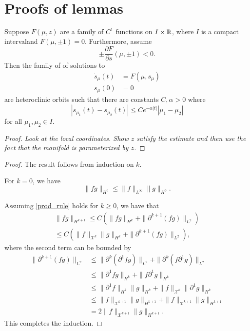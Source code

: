\chapter{Proofs of lemmas}\label{lemma-appendix}
\begin{lem}
	Suppose \(F(\mu, z)\) are a family of \(C^1\) functions on \(I \times \mathbb{R}\), where \(I\) is a compact intervaland \(F(\mu, \pm 1) = 0\). Furthermore, assume
	\begin{equation}
		\pm \frac{\partial F}{\partial s} (\mu , \pm 1) < 0.
	\end{equation}
	Then the family of of solutions to 
	\begin{equation}
		\begin{aligned}
			\dot s_\mu(t) &= F(\mu, s_\mu) \\
			s_\mu(0) &= 0
		\end{aligned}
	\end{equation}
	are heteroclinic orbits such that there are constants \(C, \alpha > 0\) where 
	\begin{equation}
		|s_{\mu_1} (t) - s_{\mu_2}(t) | \leq C e^{-\alpha |t|} |\mu_1- \mu_2|
	\end{equation}
	for all \(\mu_1,\mu_2 \in I\).
\end{lem}
\heteroclinicorbitsobolev*
\begin{proof}
	 \emph{Look at the local coordinates. Show \(z\) satisfy the estimate and then use the fact that the manifold is parameterized by \(z\). }
\end{proof}

\prodruleone*
\begin{proof}
	The result follows from induction on \(k\).
	
	For \(k = 0\), we have
	\begin{equation}
		\| f g \|_{H^0} \leq \| f \|_{L^\infty} \| g\|_{H^0}.
	\end{equation}
	
	Assuming \cref{prod_rule} holds for \(k\geq 0\), we have that 
	\begin{align*}
		\| f g \|_{H^{k+1}} \leq C \left( \| f g \|_{H^k} + \| \partial^{k+1}(fg) \|_{L^2}\right) \\
		\leq C \left( \| f\|_{\mathcal X^k} \| g \|_{H^k} + \| \partial^{k+1}(fg) \|_{L^2} \right),
	\end{align*}
	where the second term can be bounded by 
	\begin{align*}
		\| \partial^{k+1}(fg) \|_{L^2} &\leq \| \partial^k(\partial^1 f g ) \|_{L^2} + \| \partial^k(f \partial^1 g) \|_{L^2} \\
		&\leq \| \partial^1 f  g \|_{H^k} + \| f \partial^1 g \|_{H^k} \\
		&\leq \| \partial^1 f \|_{H^k} \|g\|_{H^k} + \|f\|_{\mathcal X^k} \|\partial^1 g\|_{H^k} \\
		&\leq \| f \|_{\mathcal X^{k+1}} \| g\|_{H^{k+1}} + \|f \|_{\mathcal X^{k+1}} \|g\|_{H^{k+1}} \\
		&= 2  \| f \|_{\mathcal X^{k+1}} \| g\|_{H^{k+1}}.
	\end{align*}
	This completes the induction.
\end{proof}

